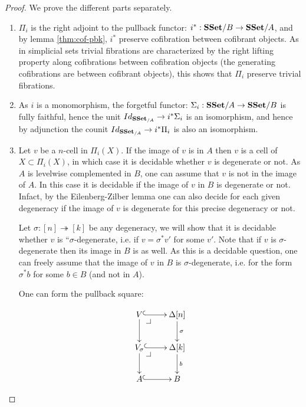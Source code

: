 \documentclass[reqno,10pt,a4paper,oneside,draft]{amsart}
\begin{document}
\begin{proof} We prove the different parts separately. 
\begin{enumerate}[$(i)$] 
\item $\Pi_i$ is the right adjoint to the pullback functor: $i^*:\mathbf{SSet}/B \rightarrow \mathbf{SSet}/A$, and by lemma \ref{thm:cof-pbk}, $i^*$ preserve cofibration between cofibrant objects. As in simplicial sets trivial fibrations are characterized by the right lifting property along cofibrations between cofibration objects (the generating cofibrations are between cofibrant objects), this shows that $\Pi_i$ preserve trivial fibrations.

\item As $i$ is a monomorphism, the forgetful functor: $\Sigma_i : \mathbf{SSet}/A \rightarrow \mathbf{SSet}/B$ is fully faithful, hence the unit $Id_{\mathbf{SSet}_{/A}} \rightarrow i^* \Sigma_i$ is an isomorphism, and hence by adjunction the counit $Id_{\mathbf{SSet}_{/A}} \rightarrow i^* \Pi_i$ is also an isomorphism.

\item Let $v$ be a $n$-cell in $\Pi_i(X)$.
If the image of $v$ is in $A$ then $v$ is a cell of $X \subset \Pi_i(X)$, in which case it is decidable whether $v$ is degenerate or not.
As $A$ is levelwise complemented in $B$, one can assume that $v$ is not in the image of $A$. In this case it is decidable if the image of $v$ in $B$ is degenerate or not.
Infact, by the Eilenberg-Zilber lemma one can also decide for each given degeneracy if the image of $v$ is degenerate for this precise degeneracy or not. 

Let $\sigma:[n] \twoheadrightarrow [k]$ be any degeneracy, we will show that it is decidable whether $v$ is ``$\sigma$-degenerate, i.e. if $v =\sigma^* v'$ for some $v'$. Note that if $v$ is $\sigma$-degenerate then its image in $B$ is as well. As this is a decidable question, one can freely assume that the image of $v$ in $B$ is $\sigma$-degenerate, i.e. for the form $\sigma^* b$ for some $b \in B$ (and not in $A$).

 One can form the pullback square:


\[
\xymatrix{
V \ar@{^{(}->}[r] \drpullback \ar[d] & \Delta[n] \ar@{->}[d]^{\sigma} \\
V_{\sigma} \ar@{^{(}->}[r] \drpullback \ar[d] & \Delta[k] \ar@{->}[d]^b \\
A \ar@{^{(}->}[r] &  B }
\]


\end{enumerate}
\end{proof}
\end{document}
